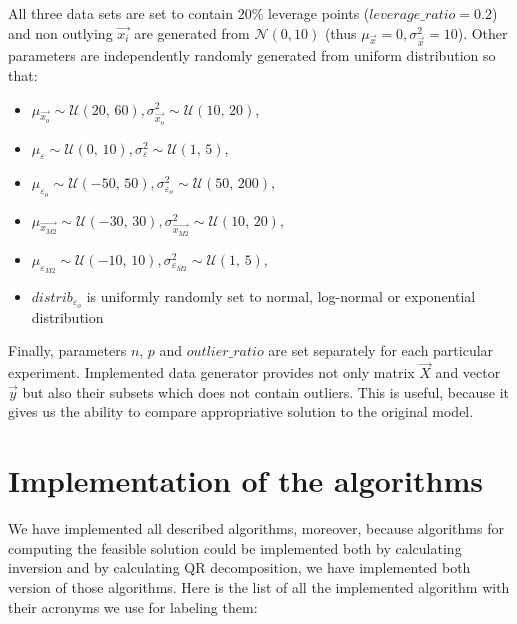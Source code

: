 All three data sets are set to contain $20\%$ leverage points ($leverage\_ratio = 0.2$) and non outlying $\vec{x_i}$ are generated from $\mathcal{N}(0,10)$ (thus $\mu_{\vec{x}} = 0, \sigma^{2}_{\vec{x}} = 10$). Other parameters are independently randomly generated from uniform distribution so that:
\begin{itemize}
    \item $\mu_{\vec{x_o}} \sim \mathcal{U}(20,\,60), \sigma^{2}_{\vec{x_o}} \sim \mathcal{U}(10,\,20)$,
    \item $\mu_{\varepsilon} \sim \mathcal{U}(0,\,10), \sigma^{2}_{\varepsilon}  \sim \mathcal{U}(1,\,5)$,
    \item $\mu_{\varepsilon_o} \sim \mathcal{U}(-50,\,50), \sigma^{2}_{\varepsilon_o} \sim \mathcal{U}(50,\,200)$,
    \item $\mu_{\vec{x_{M2}}} \sim \mathcal{U}(-30,\,30), \sigma^{2}_{\vec{x_{M2}}} \sim \mathcal{U}(10,\,20)$,
    \item  $\mu_{\varepsilon_{M2}}  \sim \mathcal{U}(-10,\,10) , \sigma^{2}_{\varepsilon_{M2}}\sim \mathcal{U}(1,\,5)$,
    \item $distrib_{\varepsilon_o}$ is uniformly randomly set to normal, log-normal  or exponential distribution 
\end{itemize}
Finally, parameters $n$, $p$ and $outlier\_ratio$  are set separately for each particular experiment. Implemented data generator provides not only matrix $\vec{X}$ and vector $\vec{y}$ but also their subsets which does not contain outliers. This is useful, because it gives us the ability to compare appropriative solution to the original model.

\section{Implementation of the algorithms}
We have implemented all described algorithms, moreover, because algorithms for computing the feasible solution could be implemented both by calculating inversion and by calculating QR decomposition, we have implemented both version of those algorithms. Here is the list of all the implemented algorithm with their acronyms we use for labeling them:

